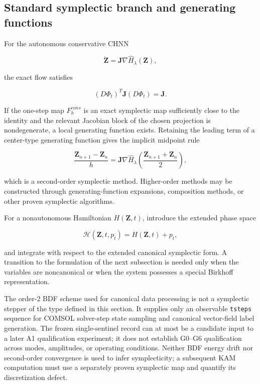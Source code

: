\subsection{Standard symplectic branch and generating functions}\label{sec:symplectic-kam-5-2}

For the autonomous conservative CHNN

\begin{equation}
\label{eq:symplectic-kam-5-1}
\dot{\mathbf{Z}} = \mathbf{J}\nabla{\widehat{H}}_{\lambda}\left( \mathbf{Z} \right),
\end{equation}

the exact flow satisfies

\begin{equation}
\label{eq:symplectic-kam-5-2}
\left( D\Phi_{t} \right)^{T}\mathbf{J}\left( D\Phi_{t} \right) = \mathbf{J}.
\end{equation}

If the one-step map \(F_{h}^{cons}\) is an exact symplectic map sufficiently close to the identity and the relevant Jacobian block of the chosen projection is nondegenerate, a local generating function exists. Retaining the leading term of a center-type generating function gives the implicit midpoint rule

\begin{equation}
\label{eq:symplectic-kam-5-3}
\frac{\mathbf{Z}_{n + 1} - \mathbf{Z}_{n}}{h} = \mathbf{J}\nabla{\widehat{H}}_{\lambda}\left( \frac{\mathbf{Z}_{n + 1} + \mathbf{Z}_{n}}{2} \right),
\end{equation}

which is a second-order symplectic method. Higher-order methods may be constructed through generating-function expansions, composition methods, or other proven symplectic algorithms\cite{FengQin2010}.

For a nonautonomous Hamiltonian \(H\left( \mathbf{Z},t \right)\), introduce the extended phase space

\begin{equation}
\label{eq:symplectic-kam-5-4}
\mathcal{H}\left( \mathbf{Z},t,p_{t} \right) = H\left( \mathbf{Z},t \right) + p_{t},
\end{equation}

and integrate with respect to the extended canonical symplectic form. A transition to the formulation of the next subsection is needed only when the variables are noncanonical or when the system possesses a special Birkhoff representation.

The order-2 BDF scheme used for canonical data processing is not a symplectic stepper of the type defined in this section. It supplies only an observable \texttt{tsteps} sequence for COMSOL solver-step state sampling and canonical vector-field label generation. The frozen single-sentinel record can at most be a candidate input to a later A1 qualification experiment; it does not establish G0--G6 qualification across modes, amplitudes, or operating conditions. Neither BDF energy drift nor second-order convergence is used to infer symplecticity; a subsequent KAM computation must use a separately proven symplectic map and quantify its discretization defect.

